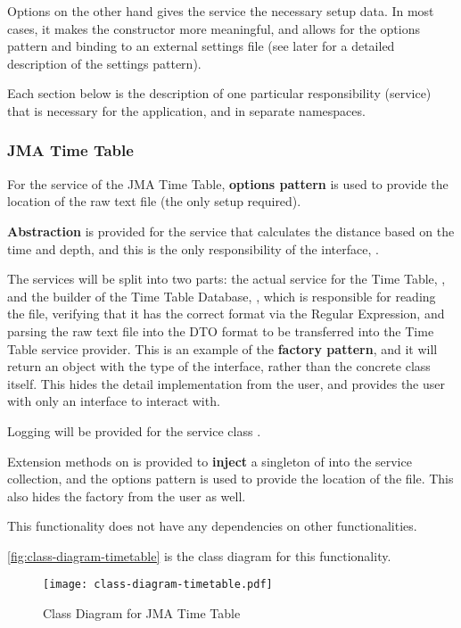 Options on the other hand gives the service the necessary setup data. In most cases, it makes the constructor more meaningful, and allows for the options pattern and binding to an external settings file (see later for a detailed description of the settings pattern).

Each section below is the description of one particular responsibility (service) that is necessary for the application, and in separate namespaces.

\subsubsection{JMA Time Table}

For the service of the JMA Time Table, \textbf{options pattern} is used to provide the location of the raw text file (the only setup required).

\textbf{Abstraction} is provided for the service that calculates the distance based on the time and depth, and this is the only responsibility of the interface, .

The services will be split into two parts: the actual service for the Time Table, , and the builder of the Time Table Database, , which is responsible for reading the file, verifying that it has the correct format via the Regular Expression, and parsing the raw text file into the DTO format to be transferred into the Time Table service provider. This is an example of the \textbf{factory pattern}, and it will return an object with the type of the interface, rather than the concrete class itself. This hides the detail implementation from the user, and provides the user with only an interface to interact with.

Logging will be provided for the service class .

Extension methods on  is provided to \textbf{inject} a singleton of  into the service collection, and the options pattern is used to provide the location of the file. This also hides the factory from the user as well.

This functionality does not have any dependencies on other functionalities.

\autoref{fig:class-diagram-timetable} is the class diagram for this functionality.

\begin{figure}[htp]
    \centering
    \texttt{[image: class-diagram-timetable.pdf]}
    \caption{Class Diagram for JMA Time Table}
    \label{fig:class-diagram-timetable}
\end{figure}

